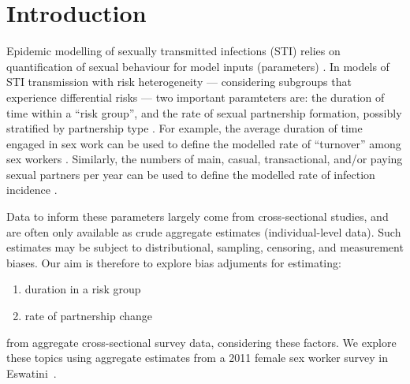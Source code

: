\section{Introduction}
Epidemic modelling of sexually transmitted infections (STI) relies on
quantification of sexual behaviour for model inputs (parameters) \cite{Garnett2002}.
In models of STI transmission with risk heterogeneity
--- \ie considering subgroups that experience differential risks ---
two important paramteters are:
the duration of time within a ``risk group'', and
the rate of sexual partnership formation, possibly stratified by partnership type
\cite{Garnett1996,Stigum1997,Watts2010,Knight2020}.
For example, the average duration of time engaged in sex work
can be used to define the modelled rate of ``turnover'' among sex workers \cite{Watts2010}.
Similarly, the numbers of main, casual, transactional, and/or paying sexual partners per year
can be used to define the modelled rate of infection incidence \cite{Boily2015}.
\par
Data to inform these parameters largely come from cross-sectional studies,
and are often only available as crude aggregate estimates (\vs individual-level data).
Such estimates may be subject to distributional, sampling, censoring, and measurement biases.
Our aim is therefore to explore bias adjuments for estimating:
\begin{enumerate}
  \item duration in a risk group
  \item rate of partnership change
\end{enumerate}
from aggregate cross-sectional survey data, considering these factors.
We explore these topics using aggregate estimates from
a 2011 female sex worker survey in Eswatini~\cite{Baral2014}.
